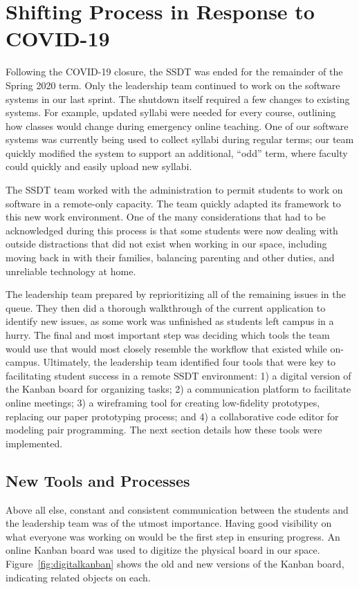 \section{Shifting Process in Response to COVID-19}

Following the COVID-19 closure, the SSDT was ended for the remainder of the Spring 2020 term. Only the leadership team continued to work on the software systems in our last sprint. The shutdown itself required a few changes to existing systems. For example, updated syllabi were needed for every course, outlining how classes would change during emergency online teaching. One of our software systems was currently being used to collect syllabi during regular terms; our team quickly modified the system to support an additional, ``odd'' term, where faculty could quickly and easily upload new syllabi.

The SSDT team worked with the administration to permit students to work on software in a remote-only capacity. The team quickly adapted its framework to this new work environment. One of the many considerations that had to be acknowledged during this process is that some students were now dealing with outside distractions that did not exist when working in our space, including moving back in with their families, balancing parenting and other duties, and unreliable technology at home.

The leadership team prepared by reprioritizing all of the remaining issues in the queue. They then did a thorough walkthrough of the current application to identify new issues, as some work was unfinished as students left campus in a hurry. The final and most important step was deciding which tools the team would use that would most closely resemble the workflow that existed while on-campus. Ultimately, the leadership team identified four tools that were key to facilitating student success in a remote SSDT environment: 1) a digital version of the Kanban board for organizing tasks; 2) a communication platform to facilitate online meetings; 3) a wireframing tool for creating low-fidelity prototypes, replacing our paper prototyping process; and 4) a collaborative code editor for modeling pair programming. The next section details how these tools were implemented.

\subsection{New Tools and Processes}
Above all else, constant and consistent communication between the students and the leadership team was of the utmost importance. Having good visibility on what everyone was working on would be the first step in ensuring progress. An online Kanban board was used to digitize the physical board in our space. Figure~\ref{fig:digitalkanban} shows the old and new versions of the Kanban board, indicating related objects on each.

